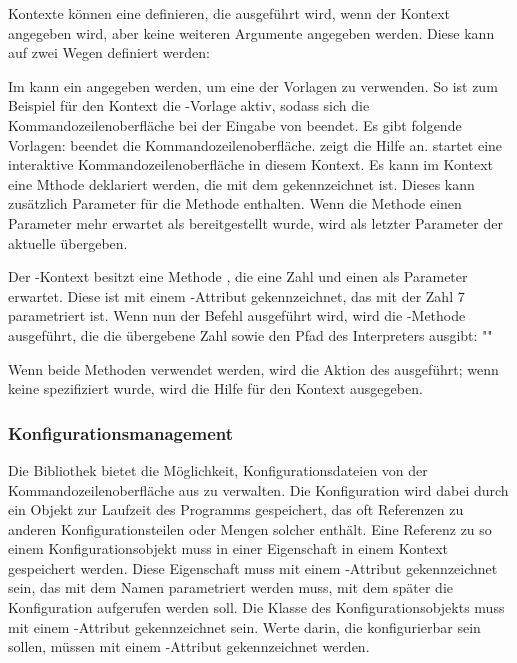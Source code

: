 Kontexte können eine  definieren, die ausgeführt wird, wenn der Kontext angegeben wird, aber keine weiteren Argumente angegeben werden.
Diese kann auf zwei Wegen definiert werden:
\begin{outline}
 \1 Im  kann ein  angegeben werden, um eine der Vorlagen zu verwenden.
 So ist zum Beispiel für den  Kontext die -Vorlage aktiv,
 sodass sich die Kommandozeilenoberfläche bei der Eingabe von  beendet.
 Es gibt folgende Vorlagen:
 \2  beendet die Kommandozeilenoberfläche.
 \2  zeigt die Hilfe an.
 \2  startet eine interaktive Kommandozeilenoberfläche in diesem Kontext.
 \1 Es kann im Kontext eine Mthode deklariert werden, die mit dem  gekennzeichnet ist.
 Dieses kann zusätzlich Parameter für die Methode enthalten.
 Wenn die Methode einen Parameter mehr erwartet als bereitgestellt wurde, wird als letzter Parameter der aktuelle  übergeben.
 
 Der -Kontext besitzt eine Methode , die eine Zahl und einen  als Parameter erwartet.
 Diese ist mit einem -Attribut gekennzeichnet, das mit der Zahl 7 parametriert ist.
 Wenn nun der Befehl  ausgeführt wird, wird die -Methode ausgeführt, die die übergebene Zahl sowie den Pfad des Interpreters ausgibt:
 ""
\end{outline}
 Wenn beide Methoden verwendet werden, wird die Aktion des  ausgeführt;
 wenn keine spezifiziert wurde, wird die Hilfe für den Kontext ausgegeben.

\subsubsection{Konfigurationsmanagement}\label{ConfigurationManagement}
Die Bibliothek bietet die Möglichkeit, Konfigurationsdateien von der Kommandozeilenoberfläche aus zu verwalten.
Die Konfiguration wird dabei durch ein Objekt zur Laufzeit des Programms gespeichert, das oft Referenzen zu anderen Konfigurationsteilen oder Mengen solcher enthält.
Eine Referenz zu so einem Konfigurationsobjekt muss in einer Eigenschaft in einem Kontext gespeichert werden.
Diese Eigenschaft muss mit einem -Attribut gekennzeichnet sein, das mit dem Namen parametriert werden muss,
mit dem später die Konfiguration aufgerufen werden soll.
Die Klasse des Konfigurationsobjekts muss mit einem -Attribut gekennzeichnet sein.
Werte darin, die konfigurierbar sein sollen, müssen mit einem -Attribut gekennzeichnet werden.


